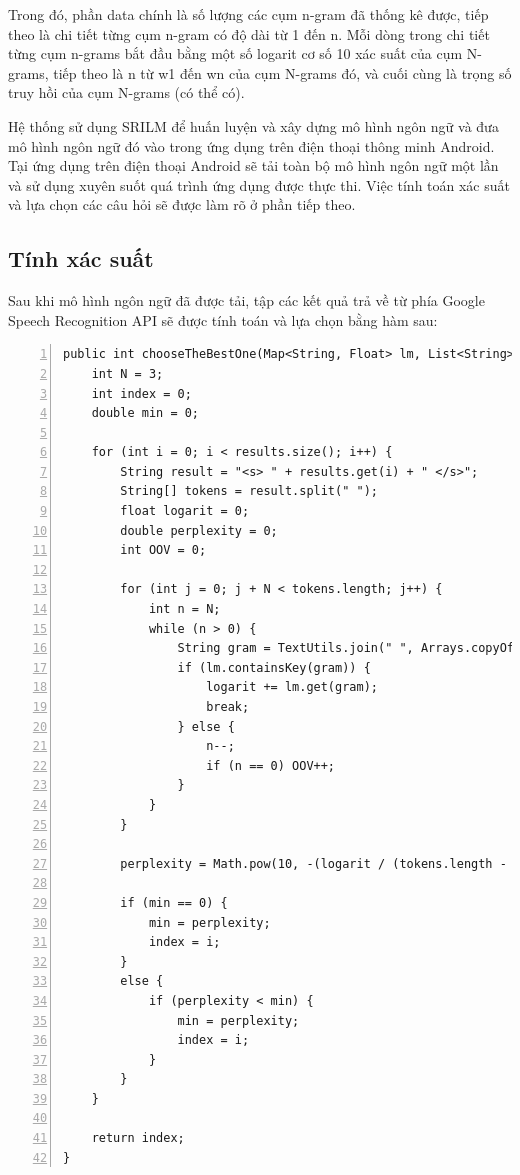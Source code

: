\documentclass[12pt]{report}
\begin{document}
Trong đó, phần data chính là số lượng các cụm n-gram đã thống kê được, tiếp theo là chi tiết từng cụm n-gram có độ dài từ 1 đến n. Mỗi dòng trong chi tiết từng cụm n-grams bắt đầu bằng một số logarit cơ số 10 xác suất của cụm N-grams, tiếp theo là n từ w1 đến wn của cụm N-grams đó, và cuối cùng là trọng số truy hồi của cụm N-grams (có thể có).

Hệ thống sử dụng SRILM để huấn luyện và xây dựng mô hình ngôn ngữ và đưa mô hình ngôn ngữ đó vào trong ứng dụng trên điện thoại thông minh Android. Tại ứng dụng trên điện thoại Android sẽ tải toàn bộ mô hình ngôn ngữ một lần và sử dụng xuyên suốt quá trình ứng dụng được thực thi. Việc tính toán xác suất và lựa chọn các câu hỏi sẽ được làm rõ ở phần tiếp theo.

\subsection{Tính xác suất}

Sau khi mô hình ngôn ngữ đã được tải, tập các kết quả trả về từ phía Google Speech Recognition API sẽ được tính toán và lựa chọn bằng hàm sau:

\begin{lstlisting}[frame=lines, basicstyle=\footnotesize\ttfamily, numbers=left, numberstyle=\tiny\color{black},caption= {Hàm chọn câu }, backgroundcolor=\color{background}]
public int chooseTheBestOne(Map<String, Float> lm, List<String> results) {
	int N = 3;
    int index = 0;
    double min = 0;

    for (int i = 0; i < results.size(); i++) {
        String result = "<s> " + results.get(i) + " </s>";
        String[] tokens = result.split(" ");
        float logarit = 0;
        double perplexity = 0;
        int OOV = 0;

        for (int j = 0; j + N < tokens.length; j++) {
            int n = N;
            while (n > 0) {
                String gram = TextUtils.join(" ", Arrays.copyOfRange(tokens, j, j + n));
                if (lm.containsKey(gram)) {
                    logarit += lm.get(gram);
                    break;
                } else {
                    n--;
                    if (n == 0) OOV++;
                }
            }
        }

        perplexity = Math.pow(10, -(logarit / (tokens.length - 2 - OOV)));

        if (min == 0) {
            min = perplexity;
            index = i;
        } 
        else {
            if (perplexity < min) {
                min = perplexity;
                index = i;
            }
        }
    }

    return index;
}
\end{lstlisting}
\end{document}
